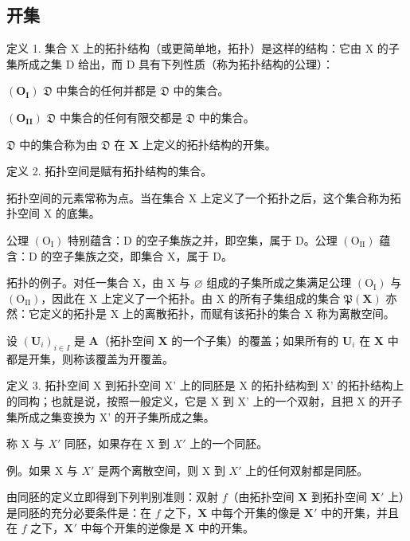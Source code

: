 \subsection{开集}

定义 1. 集合 X 上的拓扑结构（或更简单地，拓扑）是这样的结构：它由 X 的子集所成之集 D 给出，而 D 具有下列性质（称为拓扑结构的公理）：

\((\mathbf{O}_{\mathbf{I}})\) \(\mathfrak{D}\) 中集合的任何并都是 \(\mathfrak{D}\) 中的集合。

\((\mathbf{O}_{\mathbf{II}})\) \(\mathfrak{D}\) 中集合的任何有限交都是 \(\mathfrak{D}\) 中的集合。

\(\mathfrak{D}\) 中的集合称为由 \(\mathfrak{D}\) 在 \(\mathbf{X}\) 上定义的拓扑结构的开集。

定义 2. 拓扑空间是赋有拓扑结构的集合。

拓扑空间的元素常称为点。当在集合 X 上定义了一个拓扑之后，这个集合称为拓扑空间 X 的底集。

公理 \((\mathrm{O}_{\mathrm{I}})\) 特别蕴含：D 的空子集族之并，即空集，属于 D。公理 \((\mathrm{O}_{\mathrm{II}})\) 蕴含：D 的空子集族之交，即集合 X，属于 D。

拓扑的例子。对任一集合 X，由 X 与 \(\varnothing\) 组成的子集所成之集满足公理 \((\mathrm{O}_{\mathrm{I}})\) 与 \((\mathrm{O}_{\mathrm{II}})\)，因此在 X 上定义了一个拓扑。由 X 的所有子集组成的集合 \(\mathfrak{P}(\mathbf{X})\) 亦然：它定义的拓扑是 X 上的离散拓扑，而赋有该拓扑的集合 X 称为离散空间。

设 \((\mathbf{U}_i)_{i\in I}\) 是 \(\mathbf{A}\)（拓扑空间 \(\mathbf{X}\) 的一个子集）的覆盖；如果所有的 \(\mathbf{U}_i\) 在 \(\mathbf{X}\) 中都是开集，则称该覆盖为开覆盖。

定义 3. 拓扑空间 X 到拓扑空间 X' 上的同胚是 X 的拓扑结构到 X' 的拓扑结构上的同构；也就是说，按照一般定义，它是 X 到 X' 上的一个双射，且把 X 的开子集所成之集变换为 X' 的开子集所成之集。

称 X 与 \(X'\) 同胚，如果存在 X 到 \(X'\) 上的一个同胚。

例。如果 X 与 \(X'\) 是两个离散空间，则 X 到 \(X'\) 上的任何双射都是同胚。

由同胚的定义立即得到下列判别准则：双射 \(f\)（由拓扑空间 \(\mathbf{X}\) 到拓扑空间 \(\mathbf{X}'\) 上）是同胚的充分必要条件是：在 \(f\) 之下，\(\mathbf{X}\) 中每个开集的像是 \(\mathbf{X}'\) 中的开集，并且在 \(f\) 之下，\(\mathbf{X}'\) 中每个开集的逆像是 \(\mathbf{X}\) 中的开集。

